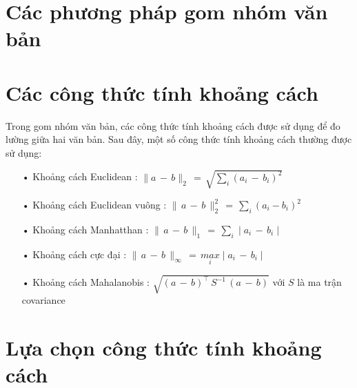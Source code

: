 
\section{Các phương pháp gom nhóm văn bản}

\section{Các công thức tính khoảng cách}
Trong gom nhóm văn bản, các công thức tính khoảng cách được sử dụng để đo lường giữa hai văn bản. Sau đây, một số công thức tính khoảng cách thường được sử dụng:
\begin{enumerate}
\item[•]Khoảng cách Euclidean : $\parallel a \,- \, b \parallel_2 \, = \, \sqrt{\underset{i}{\sum}(a_i \, - \, b_i)^2} $
\item[•]Khoảng cách Euclidean vuông : $\parallel \, a \, - \, b \, \parallel^2_2 \, = \, \underset{i}{\sum} (a_i - b_i)^2$
\item[•]Khoảng cách Manhatthan : $\parallel \, a \, - \, b \, \parallel_1 \, = \, \underset{i}{\sum} \mid a_i \, - \, b_i\mid$
\item[•]Khoảng cách cực đại : $\parallel \, a \, - \, b\, \parallel_\infty \, = \, \underset{i}{max} \mid a_i \, - \, b_i \mid$
\item[•]Khoảng cách Mahalanobis : $\sqrt{(a \, - \, b)^{\top} \, S^{-1} \, (a \, - \, b)}$ với $S$ là ma trận covariance
\end{enumerate}

\section{Lựa chọn công thức tính khoảng cách}

